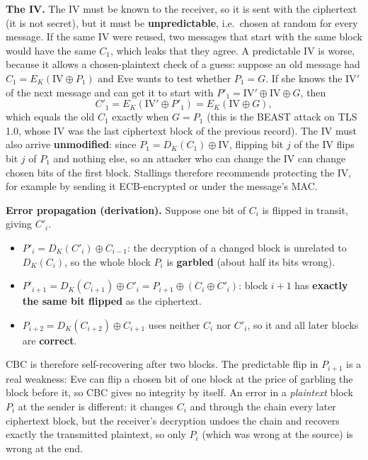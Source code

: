 \textbf{The IV.} The IV must be known to the receiver, so it is sent with the ciphertext (it is not secret), but it must be \textbf{unpredictable}, i.e.\ chosen at random for every message. If the same IV were reused, two messages that start with the same block would have the same $C_1$, which leaks that they agree. A predictable IV is worse, because it allows a chosen-plaintext check of a guess: suppose an old message had $C_1 = E_K(\mathrm{IV} \oplus P_1)$ and Eve wants to test whether $P_1 = G$. If she knows the IV$'$ of the next message and can get it to start with $P'_1 = \mathrm{IV}' \oplus \mathrm{IV} \oplus G$, then
\[
C'_1 = E_K(\mathrm{IV}' \oplus P'_1) = E_K(\mathrm{IV} \oplus G),
\]
which equals the old $C_1$ exactly when $G = P_1$ (this is the BEAST attack on TLS 1.0, whose IV was the last ciphertext block of the previous record). The IV must also arrive \textbf{unmodified}: since $P_1 = D_K(C_1) \oplus \mathrm{IV}$, flipping bit $j$ of the IV flips bit $j$ of $P_1$ and nothing else, so an attacker who can change the IV can change chosen bits of the first block. Stallings therefore recommends protecting the IV, for example by sending it ECB-encrypted or under the message's MAC.

\textbf{Error propagation (derivation).} Suppose one bit of $C_i$ is flipped in transit, giving $C'_i$.
\begin{itemize}
  \item $P'_i = D_K(C'_i) \oplus C_{i-1}$: the decryption of a changed block is unrelated to $D_K(C_i)$, so the whole block $P_i$ is \textbf{garbled} (about half its bits wrong).
  \item $P'_{i+1} = D_K(C_{i+1}) \oplus C'_i = P_{i+1} \oplus (C_i \oplus C'_i)$: block $i + 1$ has \textbf{exactly the same bit flipped} as the ciphertext.
  \item $P_{i+2} = D_K(C_{i+2}) \oplus C_{i+1}$ uses neither $C_i$ nor $C'_i$, so it and all later blocks are \textbf{correct}.
\end{itemize}
CBC is therefore self-recovering after two blocks. The predictable flip in $P_{i+1}$ is a real weakness: Eve can flip a chosen bit of one block at the price of garbling the block before it, so CBC gives no integrity by itself. An error in a \emph{plaintext} block $P_i$ at the sender is different: it changes $C_i$ and through the chain every later ciphertext block, but the receiver's decryption undoes the chain and recovers exactly the transmitted plaintext, so only $P_i$ (which was wrong at the source) is wrong at the end.

